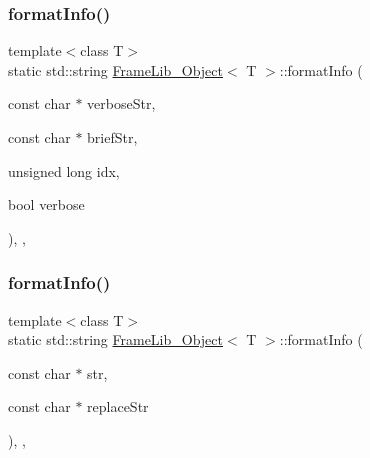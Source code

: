 \subsubsection{\texorpdfstring{format\+Info()}{formatInfo()}\hspace{0.1cm}{\footnotesize\ttfamily [3/5]}}
{\footnotesize\ttfamily template$<$class T$>$ \\
static std\+::string \hyperlink{class_frame_lib___object}{Frame\+Lib\+\_\+\+Object}$<$ T $>$\+::format\+Info (\begin{DoxyParamCaption}\item[{const char $\ast$}]{verbose\+Str,  }\item[{const char $\ast$}]{brief\+Str,  }\item[{unsigned long}]{idx,  }\item[{bool}]{verbose }\end{DoxyParamCaption})\hspace{0.3cm}{\ttfamily [inline]}, {\ttfamily [static]}, {\ttfamily [protected]}}

\mbox{\label{class_frame_lib___object_a784bf34c1ef238872b64b9668e23de28}} 
\subsubsection{\texorpdfstring{format\+Info()}{formatInfo()}\hspace{0.1cm}{\footnotesize\ttfamily [4/5]}}
{\footnotesize\ttfamily template$<$class T$>$ \\
static std\+::string \hyperlink{class_frame_lib___object}{Frame\+Lib\+\_\+\+Object}$<$ T $>$\+::format\+Info (\begin{DoxyParamCaption}\item[{const char $\ast$}]{str,  }\item[{const char $\ast$}]{replace\+Str }\end{DoxyParamCaption})\hspace{0.3cm}{\ttfamily [inline]}, {\ttfamily [static]}, {\ttfamily [protected]}}

\mbox{\label{class_frame_lib___object_a7babe2dd654fbd0c8c05eb7f7ea31550}} 
